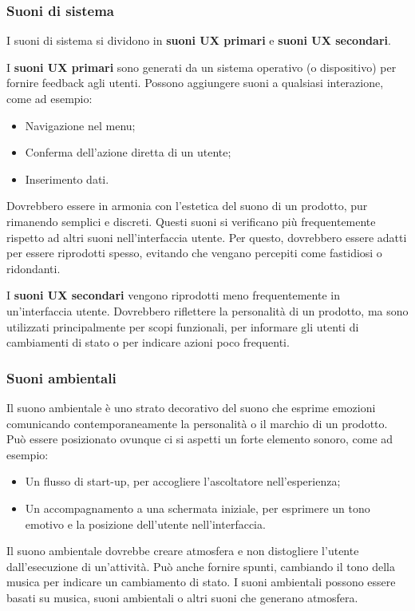 \documentclass[12pt, a4paper]{report}
\begin{document}
                \subsubsection{Suoni di sistema}
                I suoni di sistema si dividono in \textbf{suoni UX primari} e \textbf{suoni UX secondari}.

                I \textbf{suoni UX primari} sono generati da un sistema operativo (o dispositivo) per fornire feedback agli utenti. Possono aggiungere suoni a qualsiasi interazione, come ad esempio:
                \begin{itemize}
                    \item Navigazione nel menu;
                    \item Conferma dell'azione diretta di un utente;
                    \item Inserimento dati.
                \end{itemize}
                Dovrebbero essere in armonia con l'estetica del suono di un prodotto, pur rimanendo semplici e discreti. Questi suoni si verificano più frequentemente rispetto ad altri suoni nell'interfaccia
                utente. Per questo, dovrebbero essere adatti per essere riprodotti spesso, evitando che vengano percepiti come fastidiosi o ridondanti.


                I \textbf{suoni UX secondari} vengono riprodotti meno frequentemente in un'interfaccia utente. Dovrebbero riflettere la personalità di un prodotto, ma sono utilizzati principalmente per scopi
                funzionali, per informare gli utenti di cambiamenti di stato o per indicare azioni poco frequenti.


                 \subsubsection{Suoni ambientali}
                   Il suono ambientale è uno strato decorativo del suono che esprime emozioni comunicando contemporaneamente la personalità o il marchio di un prodotto. Può essere
                   posizionato ovunque ci si aspetti un forte elemento sonoro, come ad esempio:
                   \begin{itemize}
                       \item Un flusso di start-up, per accogliere l'ascoltatore nell'esperienza;
                       \item Un accompagnamento a una schermata iniziale, per esprimere un tono emotivo e la posizione dell'utente nell'interfaccia.
                   \end{itemize}
                   Il suono ambientale dovrebbe creare atmosfera e non distogliere l'utente dall'esecuzione di un'attività. Può anche fornire spunti, cambiando il tono della musica per indicare un cambiamento di stato.
                   I suoni ambientali possono essere basati su musica,  suoni ambientali o altri suoni che generano atmosfera.
\end{document}
